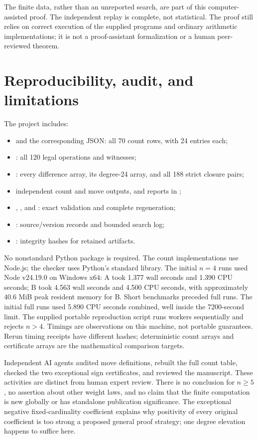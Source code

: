 \documentclass[11pt,a4paper]{article}
\begin{document}
The finite data, rather than an unreported search, are part of this
computer-assisted proof. The independent replay is complete, not
statistical. The proof still relies on correct execution of the supplied
programs and ordinary arithmetic implementations; it is not a
proof-assistant formalization or a human peer-reviewed theorem.

\section{Reproducibility, audit, and limitations}
The project includes:
\begin{itemize}
\item {} and the corresponding JSON: all
70 count rows, with 24 entries each;
\item {}: all 120 legal operations and witnesses;
\item {}: every difference array, its
degree-24 array, and all 188 strict closure pairs;
\item independent count and move outputs, and reports in ;
\item {}, , and
: exact validation and complete regeneration;
\item {}: source/version records and bounded search log;
\item {}: integrity hashes for retained artifacts.
\end{itemize}
No nonstandard Python package is required. The count implementations
use Node.js; the checker uses Python's standard library.
The initial $n=4$ runs used Node v24.19.0 on Windows x64:
A took 1.377 wall seconds and 1.390 CPU seconds; B took 4.563 wall seconds
and 4.500 CPU seconds, with approximately 40.6 MiB peak resident memory
for B. Short benchmarks preceded full runs. The initial full runs used
5.890 CPU seconds combined, well inside the 7200-second limit.
The supplied portable reproduction script runs workers sequentially and rejects
$n>4$. Timings are observations on this machine, not portable guarantees.
Rerun timing receipts have different hashes; deterministic count arrays
and certificate arrays are the mathematical comparison targets.

Independent AI agents audited move definitions, rebuilt the full count
table, checked the two exceptional sign certificates, and reviewed the
manuscript. These activities are distinct from human expert review.
There is no conclusion for $n\geq5$, no assertion about other weight
laws, and no claim that the finite computation is new globally or
has standalone publication significance. The exceptional negative
fixed-cardinality coefficient explains why positivity of every original
coefficient is too strong a proposed general proof strategy; one degree
elevation happens to suffice here.
\end{document}
